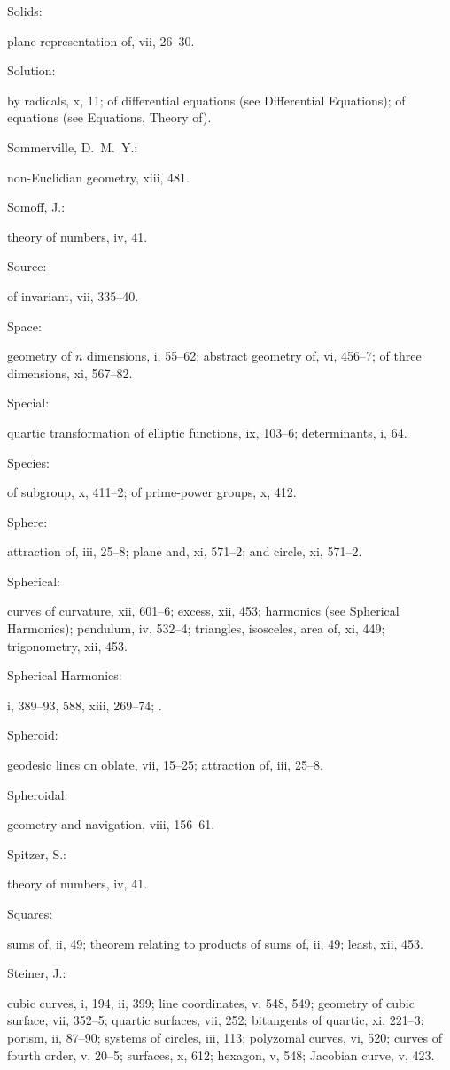 \documentclass[11pt,a4paper]{book}
\providecommand{\V}[1]{#1}
\providecommand{\IndexEntry}[2]{#1\dotfill #2\par}
\begin{document}
\IndexEntry{Solids}: plane representation of, \V{vii}, 26--30.

\IndexEntry{Solution}: by radicals, \V{x}, 11; of differential equations (see Differential Equations); of equations (see Equations, Theory of).

\IndexEntry{Sommerville, D.\ M.\ Y.}: non-Euclidian geometry, \V{xiii}, 481.

\IndexEntry{Somoff, J.}: theory of numbers, \V{iv}, 41.

\IndexEntry{Source}: of invariant, \V{vii}, 335--40.

\IndexEntry{Space}: geometry of $n$ dimensions, \V{i}, 55--62; abstract geometry of, \V{vi}, 456--7; of three dimensions, \V{xi}, 567--82.

\newpage

\setcounter{page}{124}

\IndexEntry{Special}: quartic transformation of elliptic functions, \V{ix}, 103--6; determinants, \V{i}, 64.

\IndexEntry{Species}: of subgroup, \V{x}, 411--2; of prime-power groups, \V{x}, 412.

\IndexEntry{Sphere}: attraction of, \V{iii}, 25--8; plane and, \V{xi}, 571--2; and circle, \V{xi}, 571--2.

\IndexEntry{Spherical}: curves of curvature, \V{xii}, 601--6; excess, \V{xii}, 453; harmonics (see Spherical Harmonics); pendulum, \V{iv}, 532--4; triangles, isosceles, area of, \V{xi}, 449; trigonometry, \V{xii}, 453.

\IndexEntry{Spherical Harmonics}: \V{i}, 389--93, 588, \V{xiii}, 269--74; .

\IndexEntry{Spheroid}: geodesic lines on oblate, \V{vii}, 15--25; attraction of, \V{iii}, 25--8.

\IndexEntry{Spheroidal}: geometry and navigation, \V{viii}, 156--61.

\IndexEntry{Spitzer, S.}: theory of numbers, \V{iv}, 41.

\IndexEntry{Squares}: sums of, \V{ii}, 49; theorem relating to products of sums of, \V{ii}, 49; least, \V{xii}, 453.

\IndexEntry{Steiner, J.}: cubic curves, \V{i}, 194, \V{ii}, 399; line coordinates, \V{v}, 548, 549; geometry of cubic surface, \V{vii}, 352--5; quartic surfaces, \V{vii}, 252; bitangents of quartic, \V{xi}, 221--3; porism, \V{ii}, 87--90; systems of circles, \V{iii}, 113; polyzomal curves, \V{vi}, 520; curves of fourth order, \V{v}, 20--5; surfaces, \V{x}, 612; hexagon, \V{v}, 548; Jacobian curve, \V{v}, 423.
\end{document}
